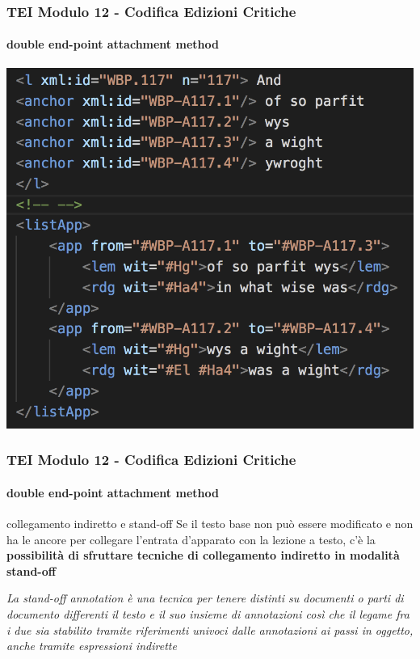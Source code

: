 \begin{frame}
    \frametitle{TEI Modulo 12 - Codifica Edizioni Critiche}
    \framesubtitle{double end-point attachment method}
    \addtocounter{nframe}{1}
   
    \begin{center}
       \includegraphics[width=.75\textwidth]{imgs/end-point-attachment-overlap.png}
    \end{center}

\end{frame}


\begin{frame}
    \frametitle{TEI Modulo 12 - Codifica Edizioni Critiche}
    \framesubtitle{double end-point attachment method}
    \addtocounter{nframe}{1}
    



    \begin{block}{collegamento indiretto e stand-off}
      Se il testo base non può essere modificato e non ha le ancore per collegare l'entrata d'apparato con la lezione a testo, c'è la \textbf{possibilità di sfruttare tecniche di collegamento indiretto in modalità stand-off}
    \end{block}

    \textit{La stand-off annotation è una tecnica per tenere distinti su documenti o parti di documento differenti il testo e il suo insieme di annotazioni così che il legame fra i due sia stabilito tramite riferimenti univoci dalle annotazioni ai passi in oggetto, anche tramite espressioni indirette}

\end{frame}

